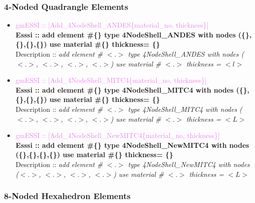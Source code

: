 \documentclass[11pt]{article}
\begin{document}
\subsubsection{4-Noded Quadrangle Elements}

  \begin{itemize}

    \item \textcolor{violet}{gmESSI :: [Add\_4NodeShell\_ANDES\{material\_no, thickness\}]} \\             
    \textbf{Esssi :: add element \#\{\} type 4NodeShell\_ANDES with nodes (\{\},\{\},\{\},\{\}) use material \#\{\} thickness= \{\}}\\
    Description :: \textit{ add element \# $<.>$ type 4NodeShell\_ANDES with nodes ($<.>$, $<.>$, $<.>$, $<.>$) use material \# $<.>$ thickness = $<l>$ }

    \item \textcolor{violet}{gmESSI :: [Add\_4NodeShell\_MITC4\{material\_no, thickness\}]} \\             
    \textbf{Esssi :: add element \#\{\} type 4NodeShell\_MITC4 with nodes (\{\},\{\},\{\},\{\}) use material \#\{\} thickness= \{\}}\\
    Description :: \textit{ add element \# $<.>$ type 4NodeShell\_MITC4 with nodes ($<.>$, $<.>$, $<.>$, $<.>$) use material \# $<.>$ thickness = $<L>$}

    \item \textcolor{violet}{gmESSI :: [Add\_4NodeShell\_NewMITC4\{material\_no, thickness\}]} \\             
    \textbf{Esssi :: add element \#\{\} type 4NodeShell\_NewMITC4 with nodes (\{\},\{\},\{\},\{\}) use material \#\{\} thickness= \{\}}\\
    Description :: \textit{ add element \# $<.>$ type 4NodeShell\_NewMITC4 with nodes ($<.>$, $<.>$, $<.>$, $<.>$) use material \# $<.>$ thickness = $<L>$}

  \end{itemize}

\subsubsection{8-Noded Hexahedron Elements}
\end{document}
